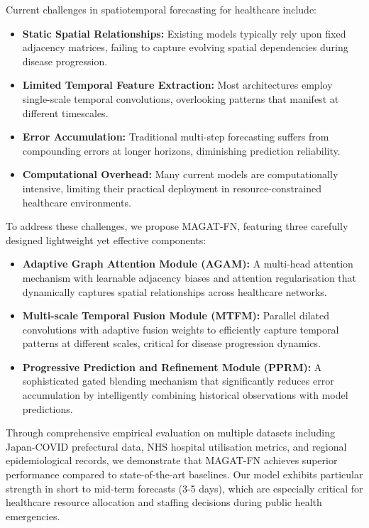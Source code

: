 \documentclass[lettersize, journal]{IEEEtran}
\begin{document}
Current challenges in spatiotemporal forecasting for healthcare include:

\begin{itemize}
\item \textbf{Static Spatial Relationships:} Existing models typically rely upon fixed adjacency matrices, failing to capture evolving spatial dependencies during disease progression.
\item \textbf{Limited Temporal Feature Extraction:} Most architectures employ single-scale temporal convolutions, overlooking patterns that manifest at different timescales.
\item \textbf{Error Accumulation:} Traditional multi-step forecasting suffers from compounding errors at longer horizons, diminishing prediction reliability.
\item \textbf{Computational Overhead:} Many current models are computationally intensive, limiting their practical deployment in resource-constrained healthcare environments.
\end{itemize}

To address these challenges, we propose MAGAT-FN, featuring three carefully designed lightweight yet effective components:

\begin{itemize}
\item \textbf{Adaptive Graph Attention Module (AGAM):} A multi-head attention mechanism with learnable adjacency biases and attention regularisation that dynamically captures spatial relationships across healthcare networks.
\item \textbf{Multi-scale Temporal Fusion Module (MTFM):} Parallel dilated convolutions with adaptive fusion weights to efficiently capture temporal patterns at different scales, critical for disease progression dynamics.
\item \textbf{Progressive Prediction and Refinement Module (PPRM):} A sophisticated gated blending mechanism that significantly reduces error accumulation by intelligently combining historical observations with model predictions.
\end{itemize}

Through comprehensive empirical evaluation on multiple datasets including Japan-COVID prefectural data, NHS hospital utilisation metrics, and regional epidemiological records, we demonstrate that MAGAT-FN achieves superior performance compared to state-of-the-art baselines. Our model exhibits particular strength in short to mid-term forecasts (3-5 days), which are especially critical for healthcare resource allocation and staffing decisions during public health emergencies.
\end{document}
